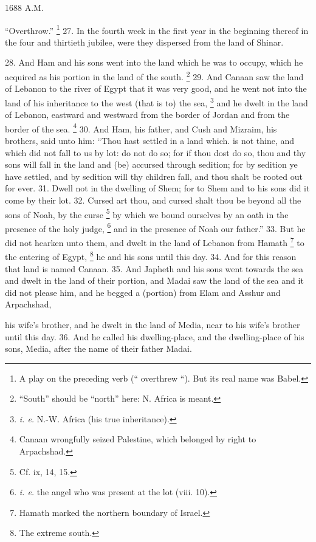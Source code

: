 1688 A.M.

``Overthrow.'' \footnote{A play on the preceding verb (`` overthrew ``). But its real name was Babel.} 27. In the fourth week in the first year in the beginning thereof in the four and thirtieth jubilee, were they dispersed from the land of Shinar.


28. And Ham and his sons went into the land which he was to occupy, which he acquired as his portion in the land of the south. \footnote{``South'' should be ``north'' here: N. Africa is meant.} 29. And Canaan saw the land of Lebanon to the river of Egypt that it was very good, and he went not into the land of his inheritance to the west (that is to) the sea, \footnote{\emph{i. e.} N.-W. Africa (his true inheritance).} and he dwelt in the land of Lebanon, eastward and westward from the border of Jordan and from the border of the sea. \footnote{Canaan wrongfully seized Palestine, which belonged by right to Arpachshad.} 30. And Ham, his father, and Cush and Mizraim, his brothers, said unto him: ``Thou hast settled in a land which. is not thine, and which did not fall to us by lot: do not do so; for if thou dost do so, thou and thy sons will fall in the land and (be) accursed through sedition; for by sedition ye have settled, and by sedition will thy children fall, and thou shalt be rooted out for ever. 31. Dwell not in the dwelling of Shem; for to Shem and to his sons did it come by their lot. 32. Cursed art thou, and cursed shalt thou be beyond all the sons of Noah, by the curse \footnote{Cf. ix, 14, 15.} by which we bound ourselves by an oath in the presence of the holy judge, \footnote{\emph{i. e.} the angel who was present at the lot (viii. 10).} and in the presence of Noah our father.'' 33. But he did not hearken unto them, and dwelt in the land of Lebanon from Hamath \footnote{Hamath marked the northern boundary of Israel.} to the entering of Egypt, \footnote{The extreme south.} he and his sons until this day. 34. And for this reason that land is named Canaan. 35. And Japheth and his sons went towards the sea and dwelt in the land of their portion, and Madai saw the land of the sea and it did not please him, and he begged a (portion) from Elam and Asshur and Arpachshad,

his wife's brother, and he dwelt in the land of Media, near to his wife's brother until this day. 36. And he called his dwelling-place, and the dwelling-place of his sons, Media, after the name of their father Madai.

